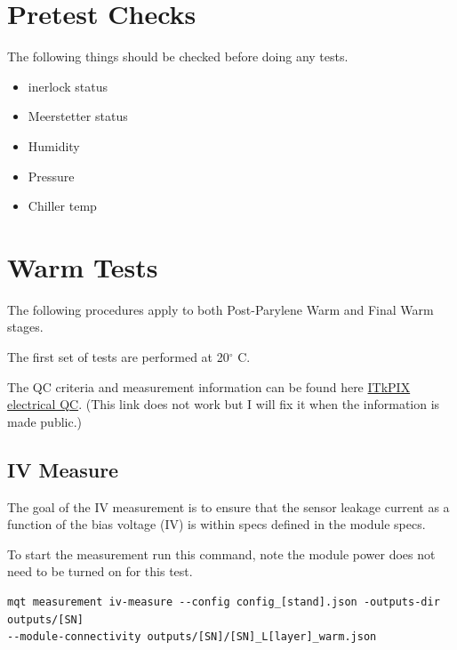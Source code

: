 \documentclass[12pt]{article}
\begin{document}
\newpage
\section{Pretest Checks}
The following things should be checked before doing any tests. 

\begin{itemize}
    \item inerlock status
    \item Meerstetter status
    \item Humidity
    \item Pressure
    \item Chiller temp
\end{itemize}

\newpage
\section{Warm Tests}

The following procedures apply to both Post-Parylene Warm and Final Warm stages.

The first set of tests are performed at 20$^\circ$ C.

The QC criteria and measurement information can be found here \href{run:./ITkPix_electrical_QC-1.pdf}{ITkPIX electrical QC}. (This link does not work but I will fix it when the information is made public.)



\subsection{IV Measure}
The goal of the IV measurement is to ensure that the sensor leakage current as a function of the bias voltage (IV) is within specs defined in the module specs. 

To start the measurement run this command, note the module power does not need to be turned on for this test.

\begin{verbatim}
mqt measurement iv-measure --config config_[stand].json -outputs-dir outputs/[SN]
--module-connectivity outputs/[SN]/[SN]_L[layer]_warm.json
\end{verbatim}
\end{document}
